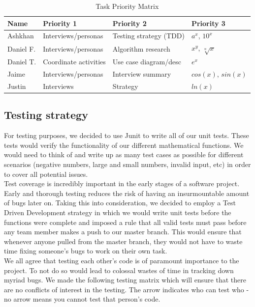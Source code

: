 \documentclass[a4paper]{article}
\begin{document}
\begin{table}[ht]
\centering
\caption{Task Priority Matrix}
\begin{tabular}{|l|l|l|l|}
\hline
\textbf{Name}&\textbf{Priority 1}  &\textbf{Priority 2}  &\textbf{Priority 3}  \\ \hline
 Ashkhan&Interviews/personas  &Testing strategy (TDD)  &$a^x$, $10^x$  \\ \hline
 Daniel F.&Interviews/personas  &Algorithm research  &$x^y$, $\sqrt[n]{x}$  \\ \hline
 Daniel T.&Coordinate activities  &Use case diagram/desc  &$e^x$  \\ \hline
 Jaime&Interviews/personas  &Interview summary  &$cos(x)$, $sin(x)$  \\ \hline
 Justin&Interviews  &Strategy  &$ln(x)$  \\ \hline
\end{tabular}
\end{table}

\subsection{Testing strategy}

For testing purposes, we decided to use Junit to write all of our unit tests. These tests would verify the functionality of our different mathematical functions. We would need to think of and write up as many test cases as possible for different scenarios (negative numbers, large and small numbers, invalid input, etc) in order to cover all potential issues. \\

Test coverage is incredibly important in the early stages of a software project. Early and thorough testing reduces the risk of having an insurmountable amount of bugs later on. Taking this into consideration, we decided to employ a Test Driven Development strategy in which we would write unit tests before the functions were complete and imposed a rule that all valid tests must pass before any team member makes a push to our master branch. This would ensure that whenever anyone pulled from the master branch, they would not have to waste time fixing someone's bugs to work on their own task. \\

We all agree that testing each other's code is of paramount importance to the project. To not do so would lead to colossal wastes of time in tracking down myriad bugs. We made the following testing matrix which will ensure that there are no conflicts of interest in the testing. The arrow indicates who can test who - no arrow means you cannot test that person's code.
\end{document}
